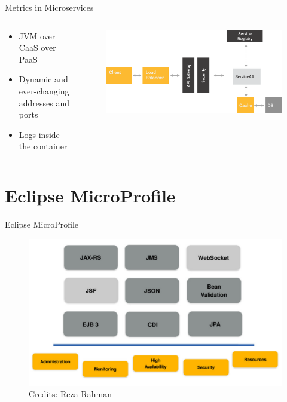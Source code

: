 \documentclass{beamer}
\begin{document}
\begin{frame}{Metrics in Microservices}
\begin{columns}[T] %
	\begin{column}[T]{3cm} %
		\begin{itemize}
			\item JVM over CaaS over PaaS
			\item Dynamic and ever-changing addresses and ports
			\item Logs inside the container
		\end{itemize}
	\end{column}
	\begin{column}[T]{7cm} %
		\begin{figure}
			\centering
			\includegraphics[width=\linewidth]{Images/microservicios}
		\end{figure}
		
	\end{column}
\end{columns}
\end{frame}

\section{Eclipse MicroProfile}

\begin{frame}{Eclipse MicroProfile}
	\begin{figure}
		\centering
		\includegraphics[width=\linewidth]{Images/javaeemicropancake}
		\caption{Credits: Reza Rahman}
	\end{figure}
\end{frame}
\end{document}
